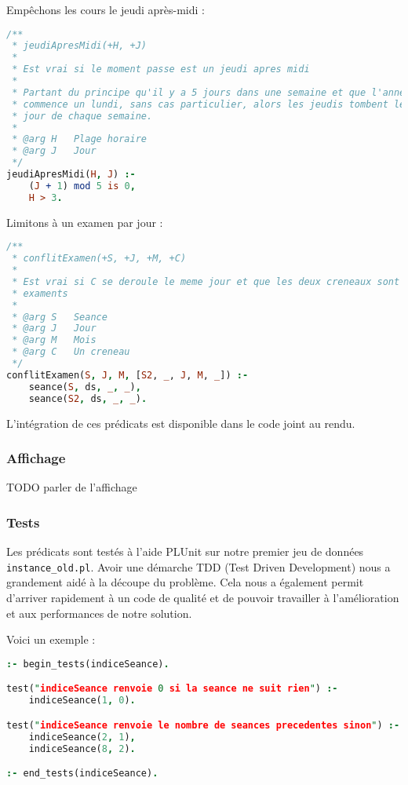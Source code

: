 Empêchons les cours le jeudi après-midi :

\begin{lstlisting}[language=Prolog, caption=Jeudi après-midi,
captionpos=b, label={lst:jeudi}]
/**
 * jeudiApresMidi(+H, +J)
 *
 * Est vrai si le moment passe est un jeudi apres midi
 *
 * Partant du principe qu'il y a 5 jours dans une semaine et que l'annee
 * commence un lundi, sans cas particulier, alors les jeudis tombent le 4eme
 * jour de chaque semaine.
 *
 * @arg H   Plage horaire
 * @arg J   Jour
 */
jeudiApresMidi(H, J) :-
    (J + 1) mod 5 is 0,
    H > 3.
\end{lstlisting}

Limitons à un examen par jour :

\begin{lstlisting}[language=Prolog, caption=Détection de conflit d'exament,
captionpos=b, label={lst:examen}]
/**
 * conflitExamen(+S, +J, +M, +C)
 *
 * Est vrai si C se deroule le meme jour et que les deux creneaux sont des
 * examents
 *
 * @arg S   Seance
 * @arg J   Jour
 * @arg M   Mois
 * @arg C   Un creneau
 */
conflitExamen(S, J, M, [S2, _, J, M, _]) :-
    seance(S, ds, _, _),
    seance(S2, ds, _, _).
\end{lstlisting}

L'intégration de ces prédicats est disponible dans le code joint au rendu.

\subsubsection{Affichage}
TODO parler de l'affichage

\subsubsection{Tests}

Les prédicats sont testés à l'aide PLUnit sur notre premier jeu de données
\texttt{instance\_old.pl}. Avoir une démarche TDD (Test Driven Development) nous
a grandement aidé à la découpe du problème. Cela nous a également permit
d'arriver rapidement à un code de qualité et de pouvoir travailler à
l'amélioration et aux performances de notre solution.

Voici un exemple :

\begin{lstlisting}[language=Prolog, caption=Exemple de test, captionpos=b,
label={lst:test}]
:- begin_tests(indiceSeance).

test("indiceSeance renvoie 0 si la seance ne suit rien") :-
    indiceSeance(1, 0).

test("indiceSeance renvoie le nombre de seances precedentes sinon") :-
    indiceSeance(2, 1),
    indiceSeance(8, 2).

:- end_tests(indiceSeance).
\end{lstlisting}

